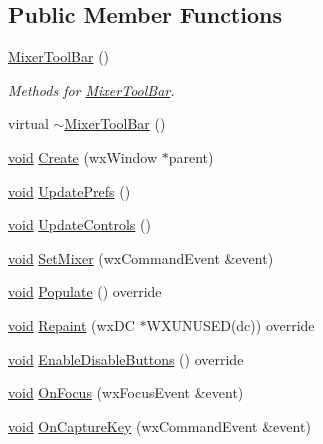 \subsection*{Public Member Functions}
\begin{DoxyCompactItemize}
\item 
\hyperlink{class_mixer_tool_bar_a4220d1c7e6e9e51c09db4b96580be7e9}{Mixer\+Tool\+Bar} ()
\begin{DoxyCompactList}\small\item\em Methods for \hyperlink{class_mixer_tool_bar}{Mixer\+Tool\+Bar}. \end{DoxyCompactList}\item 
virtual \hyperlink{class_mixer_tool_bar_a738a98549561757e9207d2c67b922a73}{$\sim$\+Mixer\+Tool\+Bar} ()
\item 
\hyperlink{sound_8c_ae35f5844602719cf66324f4de2a658b3}{void} \hyperlink{class_mixer_tool_bar_ac1ca8857845e667e421ebc61b174c5eb}{Create} (wx\+Window $\ast$parent)
\item 
\hyperlink{sound_8c_ae35f5844602719cf66324f4de2a658b3}{void} \hyperlink{class_mixer_tool_bar_a9b821418b6018d0e6c660719e4160923}{Update\+Prefs} ()
\item 
\hyperlink{sound_8c_ae35f5844602719cf66324f4de2a658b3}{void} \hyperlink{class_mixer_tool_bar_acbd61cd691c3e24cb5775fb2e3feb0a0}{Update\+Controls} ()
\item 
\hyperlink{sound_8c_ae35f5844602719cf66324f4de2a658b3}{void} \hyperlink{class_mixer_tool_bar_ad6398a3826cb543524a20657739b70ef}{Set\+Mixer} (wx\+Command\+Event \&event)
\item 
\hyperlink{sound_8c_ae35f5844602719cf66324f4de2a658b3}{void} \hyperlink{class_mixer_tool_bar_ad2378869d73b778af25de91e6a2c93b6}{Populate} () override
\item 
\hyperlink{sound_8c_ae35f5844602719cf66324f4de2a658b3}{void} \hyperlink{class_mixer_tool_bar_a2627a730cc9cd9446863f22d1bb816a3}{Repaint} (wx\+DC $\ast$W\+X\+U\+N\+U\+S\+ED(dc)) override
\item 
\hyperlink{sound_8c_ae35f5844602719cf66324f4de2a658b3}{void} \hyperlink{class_mixer_tool_bar_ae719ff00273bce606a7fdbbba768fd30}{Enable\+Disable\+Buttons} () override
\item 
\hyperlink{sound_8c_ae35f5844602719cf66324f4de2a658b3}{void} \hyperlink{class_mixer_tool_bar_afe63683d4995fcc2247826812ec7e425}{On\+Focus} (wx\+Focus\+Event \&event)
\item 
\hyperlink{sound_8c_ae35f5844602719cf66324f4de2a658b3}{void} \hyperlink{class_mixer_tool_bar_a9f0e46415d0fd4df62a7944b5a7f2066}{On\+Capture\+Key} (wx\+Command\+Event \&event)

\end{DoxyCompactItemize}
